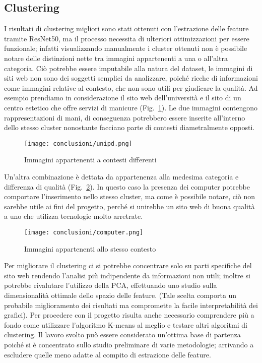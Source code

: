 \newpage 

\subsection{Clustering}
I risultati di clustering migliori sono stati ottenuti con l'estrazione delle feature tramite ResNet50, ma il processo necessita di ulteriori ottimizzazioni per essere funzionale;
infatti visualizzando manualmente i cluster ottenuti non è possibile notare delle distinzioni nette tra immagini appartenenti a una o all'altra categoria. Ciò potrebbe essere imputabile alla natura del dataset, le immagini di siti web non sono dei soggetti semplici da analizzare, poiché ricche di informazioni come immagini relative al contesto, che non sono utili per giudicare la qualità.
Ad esempio prendiamo in considerazione il sito web dell'università e il sito di un centro estetico che offre servizi di manicure (Fig.~\ref{fig:unipd-conc}).
Le due immagini contengono rappresentazioni di mani, di conseguenza potrebbero essere inserite all'interno dello stesso cluster nonostante facciano parte di contesti diametralmente opposti.
\begin{figure}[!h] 
    \centering 
    \texttt{[image: conclusioni/unipd.png]} 
    \caption{Immagini appartenenti a contesti differenti}
    \label{fig:unipd-conc}
  \end{figure}

\newpage
Un'altra combinazione è dettata da appartenenza alla medesima categoria e differenza di qualità (Fig.~\ref{fig:computer-conc}).
In questo caso la presenza dei computer potrebbe comportare l'inserimento nello stesso cluster, ma come è possibile notare, ciò non sarebbe utile ai fini del progetto, perché si unirebbe un sito web di buona qualità a uno che utilizza tecnologie molto arretrate.

\begin{figure}[!h] 
    \centering 
    \texttt{[image: conclusioni/computer.png]} 
    \caption{Immagini appartenenti allo stesso contesto}
    \label{fig:computer-conc}
  \end{figure}

Per migliorare il clustering ci si potrebbe concentrare solo su parti specifiche del sito web rendendo l'analisi più indipendente da informazioni non utili; inoltre si potrebbe rivalutare l'utilizzo della PCA, effettuando uno studio sulla dimensionalità ottimale dello spazio delle feature. (Tale scelta comporta un probabile miglioramento dei risultati ma compromette la facile interpretabilità dei grafici).
Per procedere con il progetto risulta anche necessario comprendere più a fondo come utilizzare l'algoritmo K-means al meglio e testare altri algoritmi di clustering.
Il lavoro svolto può essere considerato un'ottima base di partenza poiché si è concentrato sullo studio preliminare di varie metodologie; arrivando a escludere quelle meno adatte al compito di estrazione delle feature.

